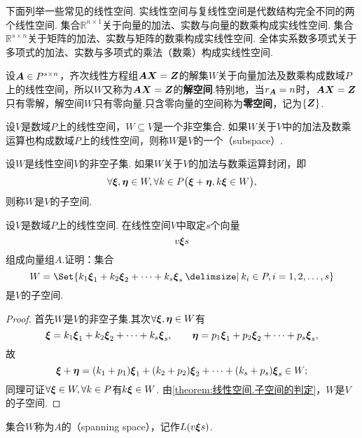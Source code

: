 \begin{example}
下面列举一些常见的线性空间.
实线性空间与复线性空间是代数结构完全不同的两个线性空间.
集合\(\mathbb{R}^{n \times 1}\)关于向量的加法、实数与向量的数乘构成实线性空间.
集合\(\mathbb{R}^{s \times n}\)关于矩阵的加法、实数与矩阵的数乘构成实线性空间.
全体实系数多项式关于多项式的加法、实数与多项式的乘法（数乘）构成实线性空间.
\end{example}

\begin{example}
设\(\boldsymbol{A} \in P^{s \times n}\)，齐次线性方程组\(\boldsymbol{A}\boldsymbol{X}=\boldsymbol{Z}\)的解集\(W\)关于向量加法及数乘构成数域\(P\)上的线性空间，所以\(W\)又称为\(\boldsymbol{A}\boldsymbol{X}=\boldsymbol{Z}\)的\textbf{解空间}.特别地，当\(r_{\boldsymbol{A}}=n\)时，\(\boldsymbol{A}\boldsymbol{X}=\boldsymbol{Z}\)只有零解，解空间\(W\)只有零向量.只含零向量的空间称为\textbf{零空间}，记为\(\{\boldsymbol{Z}\}\).
\end{example}

\begin{definition}
设\(V\)是数域\(P\)上的线性空间，\(W \subseteq V\)是一个非空集合.
如果\(W\)关于\(V\)中的加法及数乘运算也构成数域\(P\)上的线性空间，则称\(W\)是\(V\)的一个（subspace）.
\end{definition}

\begin{theorem}\label{theorem:线性空间.子空间的判定}
设\(W\)是线性空间\(V\)的非空子集.
如果\(W\)关于\(V\)的加法与数乘运算封闭，即\[
\forall \boldsymbol{\xi},\boldsymbol{\eta} \in W,
\forall k \in P
\bigl(
\boldsymbol{\xi}+\boldsymbol{\eta}, k \boldsymbol{\xi} \in W
\bigr),
\]则称\(W\)是\(V\)的子空间.
\end{theorem}

\begin{example}
设\(V\)是数域\(P\)上的线性空间.
在线性空间\(V\)中取定\(s\)个向量\[
v{\boldsymbol{\xi}}{s}
\]组成向量组\(A\).证明：集合\[
W = \Set{ k_1 \a_1 + k_2 \a_2 + \dotsb + k_s \a_s \given k_i \in P, i=1,2,\dotsc,s }
\]是\(V\)的子空间.
\begin{proof}
首先\(W\)是\(V\)的非空子集.其次\(\forall \boldsymbol{\xi},\boldsymbol{\eta} \in W\)有\[
\boldsymbol{\xi} = k_1 \boldsymbol{\xi}_1 + k_2 \boldsymbol{\xi}_2 + \dotsb + k_s \boldsymbol{\xi}_s,
\qquad
\boldsymbol{\eta} = p_1 \boldsymbol{\xi}_1 + p_2 \boldsymbol{\xi}_2 + \dotsb + p_s \boldsymbol{\xi}_s,
\]故\[
\boldsymbol{\xi}+\boldsymbol{\eta} = (k_1+p_1)\boldsymbol{\xi}_1 + (k_2+p_2)\boldsymbol{\xi}_2 + \dotsb + (k_s+p_s)\boldsymbol{\xi}_s \in W;
\]同理可证\(\forall \boldsymbol{\xi} \in W, \forall k \in P\)有\(k\boldsymbol{\xi} \in W\).
由\cref{theorem:线性空间.子空间的判定}，\(W\)是\(V\)的子空间.
\end{proof}
集合\(W\)称为\(A\)的（spanning space），记作\(L(v{\boldsymbol{\xi}}{s})\).
\end{example}

